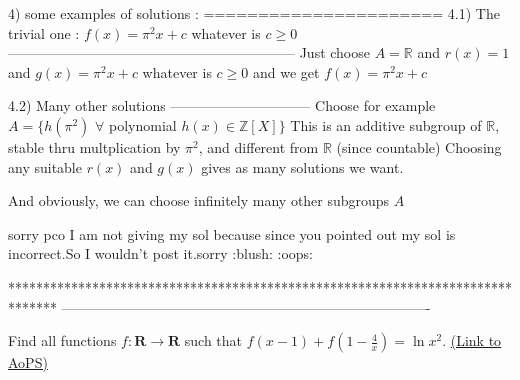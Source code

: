 \begin{solution}
4) some examples of solutions :
======================
4.1) The trivial one : $f(x)=\pi^2x+c$ whatever is $c\ge 0$
--------------------------------------------------------------
Just choose $A=\mathbb R$ and $r(x)=1$ and $g(x)=\pi^2x+c$ whatever is $c\ge 0$ and we get $f(x)=\pi^2x+c$

4.2) Many other solutions
------------------------------
Choose for example $A=\{h(\pi^2)$ $\forall$ polynomial $h(x)\in\mathbb Z[X]\}$
This is an additive subgroup of $\mathbb R$, stable thru multplication by $\pi^2$, and different from $\mathbb R$ (since countable)
Choosing any suitable $r(x)$ and $g(x)$ gives as many solutions we want.

And obviously, we can choose infinitely many other subgroups $A$
\end{solution}



\begin{solution}
	sorry pco I am not giving my sol because since you pointed out my sol is incorrect.So I wouldn't post it.sorry :blush:  :oops:
\end{solution}
*******************************************************************************
-------------------------------------------------------------------------------

\begin{problem}
	Find all functions $f:\mathbf{R} \rightarrow \mathbf{R}$ such that $f\left(x-1\right)+f\left(1-\frac{4}{x}\right)=\ln x^2$.
	\flushright \href{https://artofproblemsolving.com/community/c6h537944}{(Link to AoPS)}
\end{problem}



